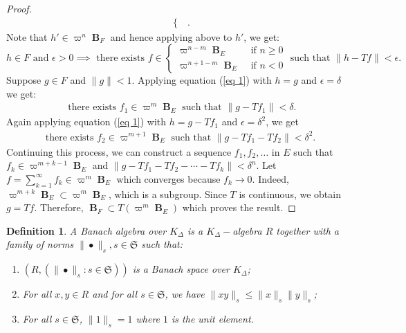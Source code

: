 \documentclass[12pts,a4paper]{amsart}
\newtheorem{definition}[proposition]{Definition}
\DeclareMathOperator{\B}{\textbf{B}}
\begin{document}
\begin{proof}
\begin{align*}
\begin{cases}
		\end{cases}.
	\end{align*}
	Note that $h'\in\varpi^n\B_F$ and hence applying above to $h'$, we get:
	\begin{equation}\label{eq 1}
		h\in F \text{ and }\epsilon>0\implies \text{ there exists } f\in
		\begin{cases}
			\varpi^{n-m}\B_E &\text{ if } n\geq 0\\
			\varpi^{n+1-m}\B_E &\text{ if }n<0
		\end{cases}
		\text{ such that }\|h-Tf\|<\epsilon.
	\end{equation}
	Suppose $g\in F$ and $\|g\|<1$. Applying equation (\ref{eq 1}) with $h=g$ and $\epsilon=\delta$ we get:
	\begin{align*}
		\text{ there exists } f_1\in \varpi^m\B_E \text{ such that }\|g-Tf_1\|<\delta.
	\end{align*}
	Again applying equation (\ref{eq 1}) with $h=g-Tf_1$ and $\epsilon=\delta^2$, we get
	\begin{align*}
		\text{there exists }f_2\in\varpi^{m+1}\B_E \text{ such that }\|g-Tf_1-Tf_2\|<\delta^2.
	\end{align*}
	Continuing this process, we can construct a sequence $f_1,f_2,\ldots$ in $E$ such that $f_k\in\varpi^{m+k-1}\B_E$ and $\|g-Tf_1-Tf_2-\cdots-Tf_k\|<\delta^n$. Let $f=\sum\limits_{k=1}^\infty f_k\in \varpi^m\B_E$ which converges because $f_k\to 0$. Indeed, $\varpi^{m+k}\B_E\subset\varpi^m\B_E$, which is a subgroup. Since $T$ is continuous, we obtain $g=Tf$. Therefore, $\B_F\subset T\left (\varpi^{m}\B_E\right)$ which proves the result.
\end{proof}

\begin{definition}
    A \emph{Banach algebra over $K_\Delta$} is a $K_\Delta-$algebra $R$ together with a family of norms $\|\bullet\|_s,s\in\mathfrak{S}$ such that:
    \begin{enumerate}
        \item[(i)] $(R,(\|\bullet\|_s: s\in\mathfrak{S}))$ is a Banach space over $K_\Delta$;
        \item[(ii)] For all $x,y\in R$ and for all $s\in\mathfrak{S}$, we have $\|xy\|_s\leq \|x\|_s\|y\|_s$;
        \item[(iii)] For all $s\in\mathfrak{S}$, $\|1\|_s=1$ where $1$ is the unit element.
    \end{enumerate}
\end{definition}
\end{document}
